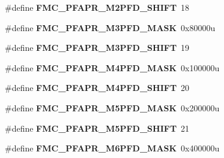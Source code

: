 \begin{DoxyCompactItemize}
\item 
\#define {\bfseries F\+M\+C\+\_\+\+P\+F\+A\+P\+R\+\_\+\+M2\+P\+F\+D\+\_\+\+S\+H\+I\+FT}~18\hypertarget{group__FMC__Register__Masks_ga52792f2b60fa3fef0d38b172867adfe9}{}\label{group__FMC__Register__Masks_ga52792f2b60fa3fef0d38b172867adfe9}

\item 
\#define {\bfseries F\+M\+C\+\_\+\+P\+F\+A\+P\+R\+\_\+\+M3\+P\+F\+D\+\_\+\+M\+A\+SK}~0x80000u\hypertarget{group__FMC__Register__Masks_ga7ec6298e08ea7c43a5233d895ebb3c06}{}\label{group__FMC__Register__Masks_ga7ec6298e08ea7c43a5233d895ebb3c06}

\item 
\#define {\bfseries F\+M\+C\+\_\+\+P\+F\+A\+P\+R\+\_\+\+M3\+P\+F\+D\+\_\+\+S\+H\+I\+FT}~19\hypertarget{group__FMC__Register__Masks_ga0de5ac6c72c9bc67057f028f4a946539}{}\label{group__FMC__Register__Masks_ga0de5ac6c72c9bc67057f028f4a946539}

\item 
\#define {\bfseries F\+M\+C\+\_\+\+P\+F\+A\+P\+R\+\_\+\+M4\+P\+F\+D\+\_\+\+M\+A\+SK}~0x100000u\hypertarget{group__FMC__Register__Masks_gaa1b82d16461f952ac2b92896f79059a3}{}\label{group__FMC__Register__Masks_gaa1b82d16461f952ac2b92896f79059a3}

\item 
\#define {\bfseries F\+M\+C\+\_\+\+P\+F\+A\+P\+R\+\_\+\+M4\+P\+F\+D\+\_\+\+S\+H\+I\+FT}~20\hypertarget{group__FMC__Register__Masks_gaf06886cc4a8e2d455cef47f111ac8a4b}{}\label{group__FMC__Register__Masks_gaf06886cc4a8e2d455cef47f111ac8a4b}

\item 
\#define {\bfseries F\+M\+C\+\_\+\+P\+F\+A\+P\+R\+\_\+\+M5\+P\+F\+D\+\_\+\+M\+A\+SK}~0x200000u\hypertarget{group__FMC__Register__Masks_ga4ac647b6c05fcd080c70febe293bd169}{}\label{group__FMC__Register__Masks_ga4ac647b6c05fcd080c70febe293bd169}

\item 
\#define {\bfseries F\+M\+C\+\_\+\+P\+F\+A\+P\+R\+\_\+\+M5\+P\+F\+D\+\_\+\+S\+H\+I\+FT}~21\hypertarget{group__FMC__Register__Masks_ga1efe3150392c8b3b9e4f42ec43bfef39}{}\label{group__FMC__Register__Masks_ga1efe3150392c8b3b9e4f42ec43bfef39}

\item 
\#define {\bfseries F\+M\+C\+\_\+\+P\+F\+A\+P\+R\+\_\+\+M6\+P\+F\+D\+\_\+\+M\+A\+SK}~0x400000u\hypertarget{group__FMC__Register__Masks_ga6d5a68ef8363082c0c7077c380e7aad6}{}\label{group__FMC__Register__Masks_ga6d5a68ef8363082c0c7077c380e7aad6}


\end{DoxyCompactItemize}
